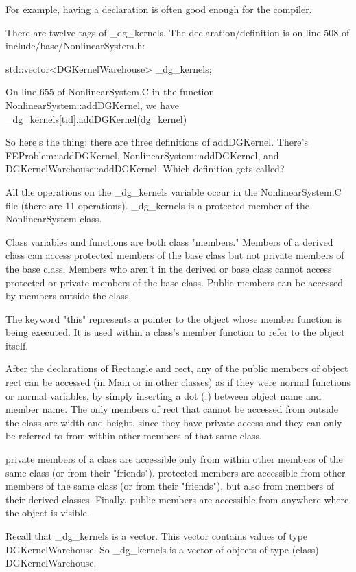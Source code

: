 For example, having a declaration is often good enough for the compiler.

There are twelve tags of _dg_kernels. The declaration/definition is on line 508 of include/base/NonlinearSystem.h:

  std::vector<DGKernelWarehouse> _dg_kernels;

On line 655 of NonlinearSystem.C in the function NonlinearSystem::addDGKernel, we have _dg_kernels[tid].addDGKernel(dg_kernel)

So here's the thing: there are three definitions of addDGKernel. There's FEProblem::addDGKernel, NonlinearSystem::addDGKernel, and DGKernelWarehouse::addDGKernel. Which definition gets called?

All the operations on the _dg_kernels variable occur in the NonlinearSystem.C file (there are 11 operations). _dg_kernels is a protected member of the NonlinearSystem class.

Class variables and functions are both class "members." Members of a derived class can access protected members of the base class but not private members of the base class. Members who aren't in the derived or base class cannot access protected or private members of the base class. Public members can be accessed by members outside the class.

The keyword "this" represents a pointer to the object whose member function is being executed. It is used within a class's member function to refer to the object itself.

After the declarations of Rectangle and rect, any of the public members of object rect can be accessed (in Main or in other classes) as if they were normal functions or normal variables, by simply inserting a dot (.) between object name and member name. The only members of rect that cannot be accessed from outside the class are width and height, since they have private access and they can only be referred to from within other members of that same class.


    private members of a class are accessible only from within other members of the same class (or from their "friends").
    protected members are accessible from other members of the same class (or from their "friends"), but also from members of their derived classes.
    Finally, public members are accessible from anywhere where the object is visible.

Recall that _dg_kernels is a vector. This vector contains values of type DGKernelWarehouse. So _dg_kernels is a vector of objects of type (class) DGKernelWarehouse.

